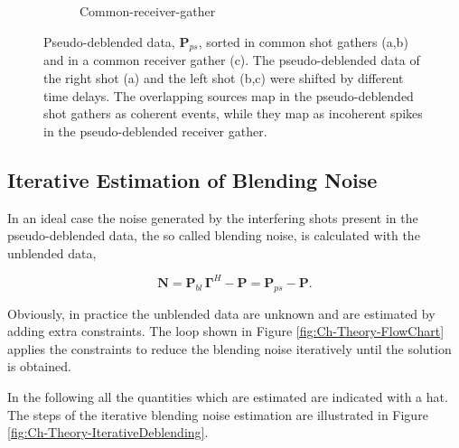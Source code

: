 \begin{figure}
\begin{subfigure}[t]{0.25\textwidth}
		\caption{Common-receiver-gather}
		\label{fig:Ch-Theory-PseudoDeblendedCRG}
	\end{subfigure}
	\caption{Pseudo-deblended data, $\mathbf{P}_{ps}$, sorted in common shot gathers (a,b) and in a common receiver gather (c). The pseudo-deblended data of the right shot (a) and the left shot (b,c) were shifted by different time delays. The overlapping sources map in the pseudo-deblended shot gathers as coherent events, while they map as incoherent spikes in the pseudo-deblended receiver gather.}
	\label{fig:Ch-Theory-PseudoDeblended}

\end{figure}


\subsection{Iterative Estimation of Blending Noise} \label{sec:IterBlenNoiseEst}

In an ideal case the noise generated by the interfering shots present in the pseudo-deblended data, the so called blending noise, is calculated with the unblended data,

\begin{equation}
	\mathbf{N} = \mathbf{P}_{bl} \, \mathbf{\Gamma}^H - \mathbf{P} = \mathbf{P}_{ps} - \mathbf{P}.
	\label{eq:Ch-Theory-Noise}
\end{equation}

Obviously, in practice the unblended data are unknown and are estimated by adding extra constraints. The loop shown in Figure \ref{fig:Ch-Theory-FlowChart} applies the constraints to reduce the blending noise iteratively until the solution is obtained. 

In the following all the quantities which are estimated are indicated with a hat. The steps of the iterative blending noise estimation are illustrated in Figure \ref{fig:Ch-Theory-IterativeDeblending}.

